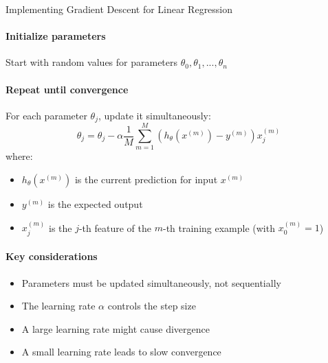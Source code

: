 \begin{KR}{Implementing Gradient Descent for Linear Regression}
\paragraph{Initialize parameters}
Start with random values for parameters $\theta_0, \theta_1, ..., \theta_n$

\paragraph{Repeat until convergence}
For each parameter $\theta_j$, update it simultaneously:
\[\theta_j = \theta_j - \alpha \frac{1}{M}\sum_{m=1}^{M}(h_\theta(x^{(m)}) - y^{(m)})x^{(m)}_j\]
where:
\begin{itemize}
    \item $h_\theta(x^{(m)})$ is the current prediction for input $x^{(m)}$
    \item $y^{(m)}$ is the expected output
    \item $x^{(m)}_j$ is the $j$-th feature of the $m$-th training example (with $x^{(m)}_0 = 1$)
\end{itemize}

\paragraph{Key considerations}
\begin{itemize}
    \item Parameters must be updated simultaneously, not sequentially
    \item The learning rate $\alpha$ controls the step size
    \item A large learning rate might cause divergence
    \item A small learning rate leads to slow convergence
\end{itemize}
\end{KR}

